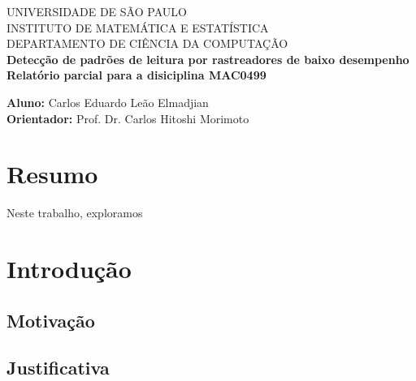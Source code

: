 \documentclass[12pt]{article}
\newcommand{\vsp}{\vspace{0.2in}}
\newcommand{\aluno}{{Carlos Eduardo Leão Elmadjian}}
\begin{document}
	
	\clearpage
	\thispagestyle{empty}
	
	\begin{minipage}[t]{6in}
		\begin{center}
			UNIVERSIDADE DE SÃO PAULO \\
			INSTITUTO DE MATEMÁTICA E ESTATÍSTICA\\
			DEPARTAMENTO DE CIÊNCIA DA COMPUTAÇÃO\\
			\vspace{5em}
			{\Large \textbf{Detecção de padrões de leitura por rastreadores de baixo desempenho}}\\
			\vspace{2em}
			{\large \textbf{Relatório parcial para a disiciplina MAC0499}}\\
			\vspace{2em} 
		\end{center}
		
		\vspace{8em}
		{\large \textbf{Aluno:} \aluno{}\\ }
		\vsp
		{\large \textbf{Orientador:} Prof. Dr. Carlos Hitoshi Morimoto\\}
		
		
	\end{minipage}
	
	\vspace{150pt}
	
	
	\newpage
	
	\vsp
	
	\section{Resumo}
	
	Neste trabalho, exploramos 
	
	\section{Introdução}
	
		\subsection{Motivação}
		
		
		\subsection{Justificativa}
	
\end{document}
